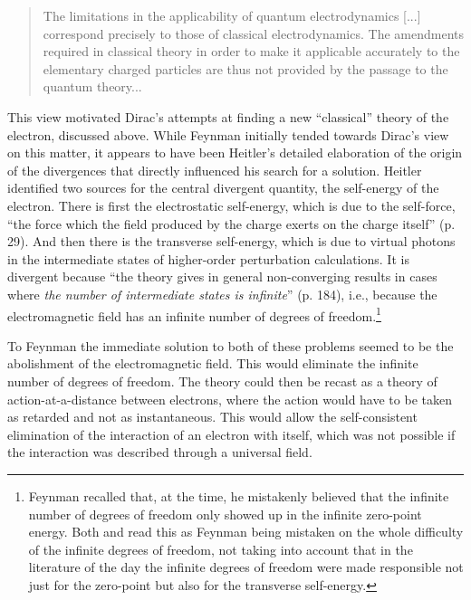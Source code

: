\documentclass[12pt,a4paper]{article}
\begin{document}
\begin{quote}
The limitations in the applicability of quantum electrodynamics [...] correspond precisely to those of classical electrodynamics. The amendments required in classical theory in order to make it applicable accurately to the elementary charged particles are thus not provided by the passage to the quantum theory... \citep[p. 296-297]{dirac_1935_the-principles}
\end{quote}

This view motivated Dirac's attempts at finding a new ``classical'' theory of the electron, discussed above. While Feynman initially tended towards Dirac's view on this matter, it appears to have been Heitler's detailed elaboration of the origin of the divergences that directly influenced his search for  a solution. Heitler identified two sources for the central divergent quantity, the self-energy of the electron. There is first the electrostatic self-energy, which is due to  the self-force, ``the force which the field produced by the charge exerts on the charge itself'' (p. 29). And then there is the transverse self-energy, which is due to virtual photons in the intermediate states of higher-order perturbation calculations. It is divergent because ``the theory gives in general non-converging results in cases where \emph{the number of intermediate states is infinite}'' (p. 184), i.e., because the electromagnetic field has an infinite number of degrees of freedom.\footnote{Feynman recalled that, at the time, he mistakenly believed that the infinite number of degrees of freedom only showed up in the infinite zero-point energy.  Both \citep[p.379-380]{schweber_1994_qed} and \citep[p.89]{mehra_1994_the-beat} read this as Feynman being mistaken on the whole difficulty of the infinite degrees of freedom, not taking into account that in the literature of the day the infinite degrees of freedom were made responsible not just for the zero-point but also for the transverse self-energy.}

To Feynman the immediate solution to both of these problems seemed to be the abolishment of the electromagnetic field. This would eliminate the infinite number of degrees of freedom. The theory could then be recast as a theory of action-at-a-distance between electrons, where the action would have to be taken as retarded and not as instantaneous. This would allow the self-consistent elimination of the interaction of an electron with itself, which was not possible if the interaction was described through a universal field.
\end{document}
